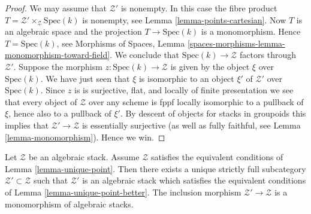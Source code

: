\begin{proof}
We may assume that $\mathcal{Z}'$ is nonempty. In this case the
fibre product $T = \mathcal{Z}' \times_\mathcal{Z} \text{Spec}(k)$
is nonempty, see
Lemma \ref{lemma-points-cartesian}.
Now $T$ is an algebraic space and the projection $T \to \text{Spec}(k)$
is a monomorphism. Hence $T = \text{Spec}(k)$, see
Morphisms of Spaces, Lemma
\ref{spaces-morphisms-lemma-monomorphism-toward-field}.
We conclude that $\text{Spec}(k) \to \mathcal{Z}$ factors through
$\mathcal{Z}'$. Suppose the morphism $z : \text{Spec}(k) \to \mathcal{Z}$
is given by the object $\xi$ over $\text{Spec}(k)$. We have just seen that
$\xi$ is isomorphic to an object $\xi'$ of $\mathcal{Z}'$ over
$\text{Spec}(k)$. Since $z$ is
is surjective, flat, and locally of finite presentation we see that
every object of $\mathcal{Z}$ over any scheme is fppf locally isomorphic
to a pullback of $\xi$, hence also to a pullback of $\xi'$. By descent of
objects for stacks in groupoids this implies that
$\mathcal{Z}' \to \mathcal{Z}$ is essentially surjective (as well as
fully faithful, see
Lemma \ref{lemma-monomorphism}).
Hence we win.
\end{proof}

\begin{lemma}
\label{lemma-improve-unique-point}
Let $\mathcal{Z}$ be an algebraic stack. Assume $\mathcal{Z}$ satisfies
the equivalent conditions of
Lemma \ref{lemma-unique-point}.
Then there exists a unique strictly full subcategory
$\mathcal{Z}' \subset \mathcal{Z}$ such that
$\mathcal{Z}'$ is an algebraic stack which satisfies the equivalent
conditions of
Lemma \ref{lemma-unique-point-better}.
The inclusion morphism $\mathcal{Z}' \to \mathcal{Z}$ is a monomorphism
of algebraic stacks.
\end{lemma}


